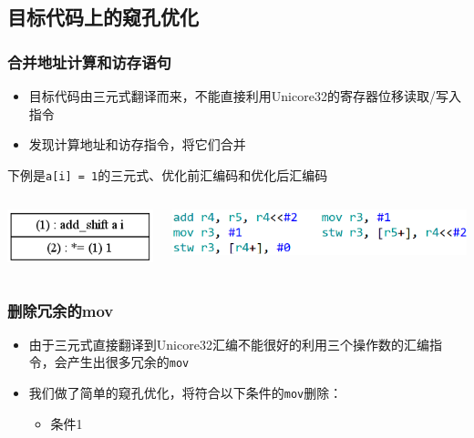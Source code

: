 \documentclass{beamer}
\begin{document}
\subsection{目标代码上的窥孔优化}
\begin{frame}
	\frametitle{合并地址计算和访存语句}
	\begin{itemize}
		\item 目标代码由三元式翻译而来，不能直接利用Unicore32的寄存器位移读取/写入指令
		\item 发现计算地址和访存指令，将它们合并
	\end{itemize}
	下例是\lstinline|a[i] = 1|的三元式、优化前汇编码和优化后汇编码
	\begin{columns}
		\begin{center}
			\includegraphics[scale=0.4]{ldst_peephole_triple.png}
		\end{center}
			\includegraphics[scale=0.4]{ldst_peephole_example.png}
	\end{columns}
\end{frame}

\begin{frame}
	\frametitle{删除冗余的mov}
	\begin{itemize}
		\item 由于三元式直接翻译到Unicore32汇编不能很好的利用三个操作数的汇编指令，会产生出很多冗余的\lstinline|mov|
		\item 我们做了简单的窥孔优化，将符合以下条件的\lstinline|mov|删除：
		\begin{itemize}
			\item 条件1
		\end{itemize}
	\end{itemize}
\end{frame}
\end{document}
